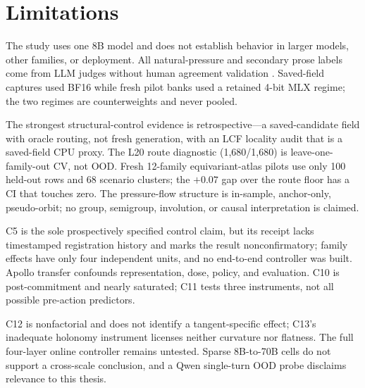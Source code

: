 \section{Limitations}

The study uses one 8B model and does not establish behavior in larger models, other families, or
deployment. All natural-pressure and secondary prose labels come from LLM judges without human
agreement validation \citep{zheng2023judging}. Saved-field captures used BF16 while fresh pilot
banks used a retained 4-bit MLX regime; the two regimes are counterweights and never pooled.

The strongest structural-control evidence is retrospective---a saved-candidate field with oracle
routing, not fresh generation, with an LCF locality audit that is a saved-field CPU proxy. The L20
route diagnostic (1{,}680/1{,}680) is leave-one-family-out CV, not OOD. Fresh 12-family
equivariant-atlas pilots use only 100 held-out rows and 68 scenario clusters; the $+0.07$ gap over
the route floor has a CI that touches zero. The pressure-flow structure is in-sample, anchor-only,
pseudo-orbit; no group, semigroup, involution, or causal interpretation is claimed.

C5 is the sole prospectively specified control claim, but its receipt lacks timestamped registration
history and marks the result nonconfirmatory; family effects have only four independent units, and no
end-to-end controller was built. Apollo transfer confounds representation, dose, policy, and
evaluation. C10 is post-commitment and nearly saturated; C11 tests three instruments, not all
possible pre-action predictors.

C12 is nonfactorial and does not identify a tangent-specific effect; C13's inadequate holonomy
instrument licenses neither curvature nor flatness. The full four-layer online controller remains
untested. Sparse 8B-to-70B cells do not support a cross-scale conclusion, and a Qwen single-turn
OOD probe disclaims relevance to this thesis.
